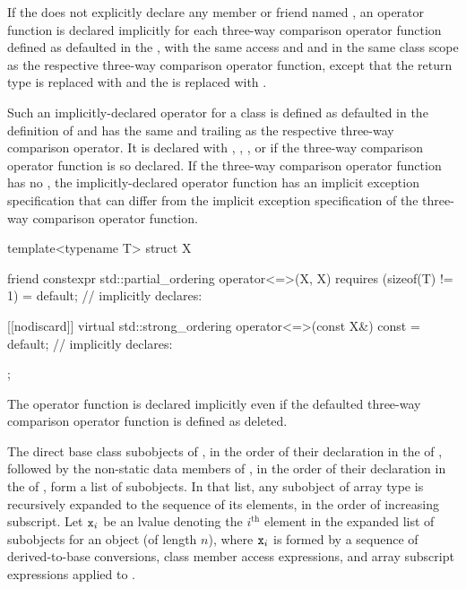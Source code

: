 \pnum
If the 
does not explicitly declare
any member or friend named ,
an \tcode{==} operator function is declared implicitly
for each three-way comparison operator function
defined as defaulted in the ,
with the same access and  and
in the same class scope as
the respective three-way comparison operator function,
except that the return type is replaced with  and
the  is replaced with .
\begin{note}
Such an implicitly-declared \tcode{==} operator for a class 
is defined as defaulted
in the definition of  and
has the same  and
trailing  as
the respective three-way comparison operator.
It is declared with , , ,
or  if
the three-way comparison operator function is so declared.
If the three-way comparison operator function
has no ,
the implicitly-declared \tcode{==} operator function
has an implicit exception specification that
can differ from the implicit exception specification of
the three-way comparison operator function.
\end{note}
\begin{example}
\begin{codeblock}
template<typename T> struct X {
  friend constexpr std::partial_ordering operator<=>(X, X) requires (sizeof(T) != 1) = default;
  // implicitly declares: 

  [[nodiscard]] virtual std::strong_ordering operator<=>(const X&) const = default;
  // implicitly declares: 
};
\end{codeblock}
\end{example}
\begin{note}
The \tcode{==} operator function is declared implicitly even if
the defaulted three-way comparison operator function
is defined as deleted.
\end{note}

\pnum
The direct base class subobjects of ,
in the order of their declaration in the  of ,
followed by the non-static data members of ,
in the order of their declaration in the  of ,
form a list of subobjects.
In that list, any subobject of array type is recursively expanded
to the sequence of its elements, in the order of increasing subscript.
Let $\texttt{\protect x}_i$ be an lvalue denoting the $i^\text{th}$ element
in the expanded list of subobjects for an object 
(of length $n$),
where $\texttt{\protect x}_i$ is
formed by a sequence of
derived-to-base conversions,
class member access expressions, and
array subscript expressions applied to .

